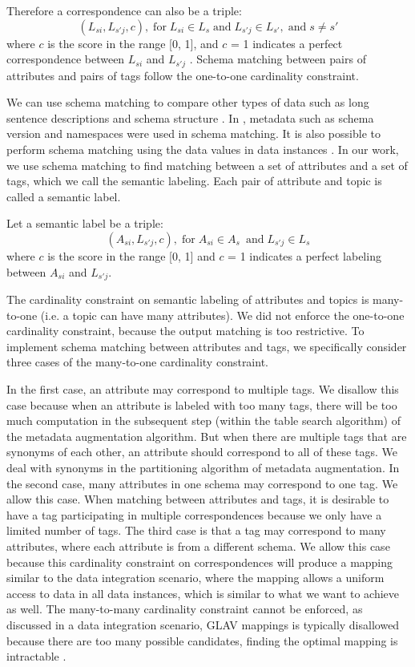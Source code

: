 Therefore a correspondence can also be a triple:
\[
(L_{si},L_{s'j},c), \; \textrm{for} \; L_{si}\in L_{s} \; \textrm{and} \; L_{s'j}\in L_{s'}, \; \textrm{and} \; s\neq s'
\]
where $c$ is the score in the range [0, 1], and $c$ = 1 indicates a perfect correspondence between $L_{si}$ and $L_{s'j}$ . Schema matching between pairs of attributes and pairs of tags follow the one-to-one cardinality constraint.

We can use schema matching to compare other types of data such as long sentence descriptions and schema structure \cite{Sorrentino2011NORMS}. In \cite{10.1145/1066157.1066283,Duchateau2009YAM}, metadata such as schema version and namespaces were used in schema matching. It is also possible to perform schema matching using the data values in data instances \cite{Rahm2001Survey}. In our work, we use schema matching to find matching between a set of attributes and a set of tags, which we call the semantic labeling. Each pair of attribute and topic is called a semantic label.

Let a semantic label be a triple: 
\[
(A_{si},L_{s'j},c), \; \textrm{for} \; A_{si}\in A_{s}\ \; \textrm{and} \; L_{s'j}\in L_{s}
\]
where $c$ is the score in the range {[}0, 1{]} and $c$ = 1 indicates a perfect labeling between $A_{si}$ and $L_{s'j}$.

The cardinality constraint on semantic labeling of attributes and topics is many-to-one (i.e. a topic can have many attributes). We did not enforce the one-to-one cardinality constraint, because the output matching is too restrictive. To implement schema matching between attributes and tags, we specifically consider three cases of the many-to-one cardinality constraint.

In the first case, an attribute may correspond to multiple tags. We disallow this case because when an attribute is labeled with too many tags, there will be too much computation in the subsequent step (within the table search algorithm) of the metadata augmentation algorithm. But when there are multiple tags that are synonyms of each other, an attribute should correspond to all of these tags. We deal with synonyms in the partitioning algorithm of metadata augmentation. In the second case, many attributes in one schema may correspond to one tag. We allow this case. When matching between attributes and tags, it is desirable to have a tag participating in multiple correspondences because we only have a limited number of tags. The third case is that a tag may correspond to many attributes, where each attribute is from a different schema. We allow this case because this cardinality constraint on correspondences will produce a mapping similar to the data integration scenario, where the mapping allows a uniform access to data in all data instances, which is similar to what we want to achieve as well. The many-to-many cardinality constraint cannot be enforced, as discussed in a data integration scenario, GLAV mappings is typically disallowed because there are too many possible candidates, finding the optimal mapping is intractable \cite{Ehrig2004QOM}.

